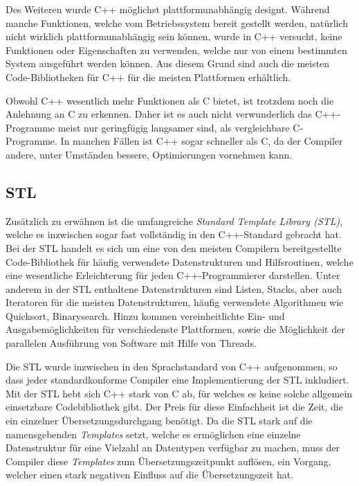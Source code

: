 Des Weiteren wurde C++ möglichst plattformunabhängig designt. Während manche Funktionen, welche vom Betriebssystem bereit gestellt werden, 
natürlich nicht wirklich plattformunabhängig sein können, wurde in C++ versucht, keine Funktionen oder Eigenschaften zu verwenden, welche
nur von einem bestimmten System ausgeführt werden können. Aus diesem Grund sind auch die meisten Code-Bibliotheken für C++ für die meisten
Plattformen erhältlich. 

Obwohl C++ wesentlich mehr Funktionen als C bietet, ist trotzdem noch die Anlehnung an C zu erkennen. Daher ist es auch nicht verwunderlich das C++-Programme meist nur geringfügig langsamer sind, als 
vergleichbare C-Programme. In manchen Fällen ist C++ sogar schneller als C, da der Compiler andere, unter Umständen bessere, Optimierungen vornehmen kann. 

\subsection{STL}
\label{sec:stl}
Zusätzlich zu erwähnen ist die umfangreiche \textit{Standard Template Library (STL)}, welche es inzwischen sogar fast vollständig in den 
C++-Standard gebracht hat. Bei der STL handelt es sich um eine von den meisten Compilern bereitgestellte Code-Bibliothek für häufig 
verwendete Datenstrukturen und Hilfsroutinen, welche eine wesentliche Erleichterung für jeden C++-Programmierer darstellen. Unter anderem
in der STL enthaltene Datenstrukturen sind Listen, Stacks, aber auch Iteratoren für die meisten Datenstrukturen, häufig verwendete Algorithmen
wie Quicksort, Binarysearch. Hinzu kommen vereinheitlichte Ein- und Ausgabemöglichkeiten für verschiedenste Plattformen, sowie die 
Möglichkeit der parallelen Ausführung von Software mit Hilfe von Threads.

Die STL wurde inzwischen in den Sprachstandard von C++ aufgenommen, so dass jeder standardkonforme Compiler eine Implementierung der STL inkludiert. Mit der STL hebt sich C++ stark von C ab, für welches es keine solche allgemein einsetzbare Codebibliothek gibt. Der Preis für diese Einfachheit ist die Zeit, die ein einzelner Übersetzungsdurchgang benötigt. Da die STL stark auf die namensgebenden
\textit{Templates} setzt, welche es ermöglichen eine einzelne Datenstruktur für eine Vielzahl an Datentypen verfügbar zu machen, muss der Compiler diese \textit{Templates} zum Übersetzungszeitpunkt
auflösen, ein Vorgang, welcher einen stark negativen Einfluss auf die Übersetzungszeit hat.

